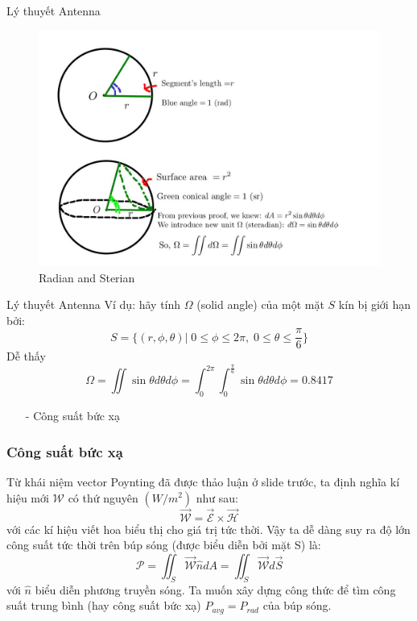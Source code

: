 \documentclass[8pt]{beamer}
\begin{document}
\begin{frame}{Lý thuyết Antenna}
\begin{figure}[h]
\includegraphics[width=1\textwidth]{sterian.jpg}
\caption{Radian and Sterian}
\end{figure}

\end{frame}
\begin{frame}{Lý thuyết Antenna}
	Ví dụ: hãy tính $\Omega$ (solid angle) của một mặt $S$ kín bị giới hạn bởi: $$S=\{(r,\phi,\theta )|\; 0\leq \phi\leq 2\pi,\;0\leq\theta\leq\frac{\pi}{6}\}$$
	Dễ thấy $$\Omega=\iint\sin{\theta}d\theta d\phi=\int_{0}^{2\pi}\int_{0}^{\frac{\pi}{6}}\sin{\theta}d\theta d\phi=0.8417$$
\begin{itemize}
	\item[-] Công suất bức xạ
\end{itemize}
\subsubsection{Công suất bức xạ}
Từ khái niệm vector Poynting đã được thảo luận ở slide trước, ta định nghĩa kí hiệu mới $\mathscr{W}$ có thứ nguyên $(W/m^2)$ như sau: $$\overrightarrow{\mathscr{W}}=\overrightarrow{\mathscr{E}}\times\overrightarrow{\mathscr{H}}$$
với các kí hiệu viết hoa biểu thị cho \alert{giá trị tức thời}. Vậy ta dễ dàng suy ra độ lớn công suất tức thời trên búp sóng (được biểu diễn bởi mặt S) là: $$\mathscr{P}=\iint_{S}\overrightarrow{\mathscr{W}}\hat n dA=\iint_{S}\overrightarrow{\mathscr{W}}d\overrightarrow{S}$$
với $\hat n$ biểu diễn phương truyền sóng. Ta muốn xây dựng công thức để tìm công suất trung bình (hay công suất bức xạ) $P_{avg}=P_{rad}$ của búp sóng.
\end{frame}
\end{document}
